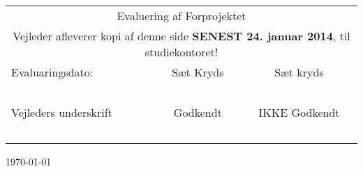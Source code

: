 \begin{center}
\begin{table}[H]
\end{table}

\ \\
\ \\
\ \\
\ \\
\ \\
\ \\
\begin{table}[H]
\begin{tabular}{|p{8.77cm}|c|c|}
	\hline
	\multicolumn{3}{|c|}{\huge Evaluering af Forprojektet}\\
	\multicolumn{3}{|c|}{Vejleder afleverer kopi af denne side \textbf{SENEST 24. januar 2014}, til studiekontoret!}\\ \hline
    Evaluaringsdato: & Sæt Kryds & Sæt kryds\\
    ~&  ~ & ~\\ \cline{1-1} 
    Vejleders underskrift & Godkendt & IKKE Godkendt \\
    ~ & ~ & ~  \\\hline
    \end{tabular}
\end{table}

\vfill %

{\large \today}\\[3cm] %
\end{center}
